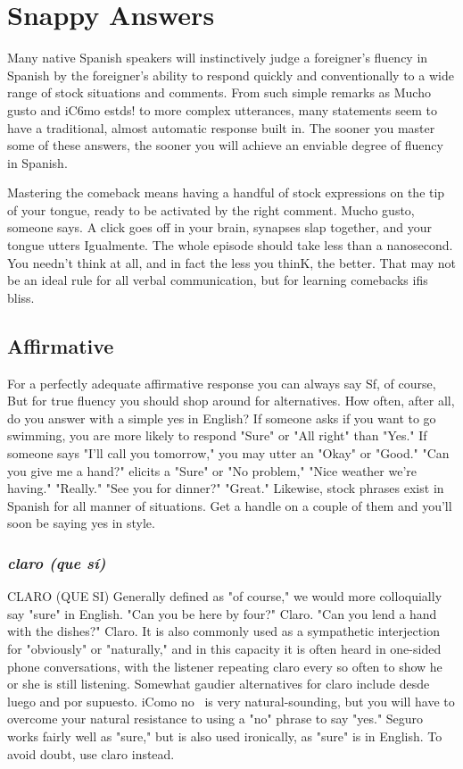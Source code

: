 \chapter{Snappy Answers}

Many native Spanish speakers will instinctively judge a foreigner's fluency in Spanish by the foreigner's ability to respond quickly
and conventionally to a wide range of stock situations and comments.
From such simple remarks as Mucho gusto and iC6mo estds! to more
complex utterances, many statements seem to have a traditional, almost automatic response built in. The sooner you master some of
these answers, the sooner you will achieve an enviable degree of fluency in Spanish.

Mastering the comeback means having a handful of stock expressions on the tip of your tongue, ready to be activated by the right
comment. Mucho gusto, someone says. A click goes off in your brain,
synapses slap together, and your tongue utters Igualmente. The whole
episode should take less than a nanosecond. You needn't think at all,
and in fact the less you thinK, the better. That may not be an ideal rule
for all verbal communication, but for learning comebacks ifis bliss.

\section{Affirmative}

For a perfectly adequate affirmative response you can always
say Sf, of course, But for true fluency you should shop around for alternatives. How often, after all, do you answer with a simple yes in
English? If someone asks if you want to go swimming, you are more
likely to respond "Sure" or "All right" than "Yes." If someone says "I'll
call you tomorrow," you may utter an "Okay" or "Good." "Can you
give me a hand?" elicits a "Sure" or "No problem," "Nice weather
we're having." "Really." "See you for dinner?" "Great." Likewise,
stock phrases exist in Spanish for all manner of situations. Get a
handle on a couple of them and you'll soon be saying yes in style.
\subsection{\emph{claro (que sí)}}
CLARO (QUE SI)
Generally defined as "of course," we would more colloquially
say "sure" in English. "Can you be here by four?" Claro. "Can you
lend a hand with the dishes?" Claro. It is also commonly used as a
sympathetic interjection for "obviously" or "naturally," and in this capacity it is often heard in one-sided phone conversations, with the listener repeating claro every so often to show he or she is still listening.
Somewhat gaudier alternatives for claro include desde luego and por
supuesto. iComo no~ is very natural-sounding, but you will have to
overcome your natural resistance to using a "no" phrase to say "yes."
Seguro works fairly well as "sure," but is also used ironically, as "sure"
is in English. To avoid doubt, use claro instead.
